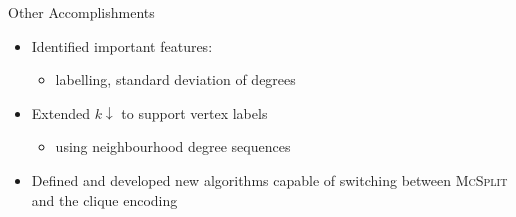 \documentclass{beamer}
\begin{document}

\begin{frame}{Other Accomplishments}
  \begin{itemize}
  \item Identified important features:
    \begin{itemize}
    \item labelling, standard deviation of degrees
    \end{itemize}
  \item Extended $k{\downarrow}$ to support vertex labels
    \begin{itemize}
    \item using neighbourhood degree sequences
    \end{itemize}
  \item Defined and developed new algorithms capable of switching between
    \textsc{McSplit} and the clique encoding
  \end{itemize}
\end{frame}
\end{document}
